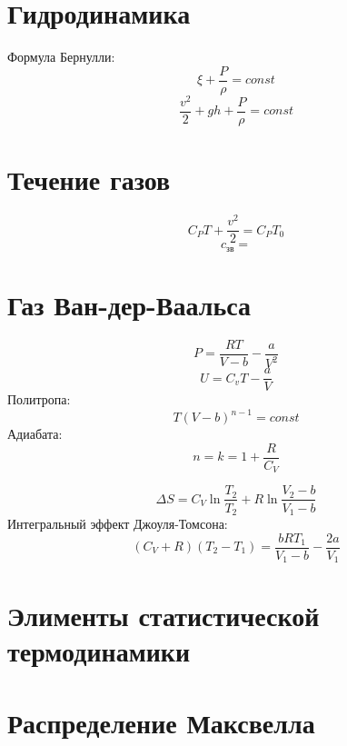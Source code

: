 \documentclass[12pt]{article}
\begin{document}
\section{Гидродинамика}
Формула Бернулли:
\begin{equation*}
\xi + \frac{P}{\rho} = const
\end{equation*}
\begin{equation*}
\frac{v^2}{2} + gh + \frac{P}{\rho} = const
\end{equation*}

\section{Течение газов}
\begin{equation*}
C_P T + \frac{v^2}{2} = C_P T_0
\end{equation*}
\begin{equation*}
c_{зв} = 
\end{equation*}

\section{Газ Ван-дер-Ваальса}
\begin{equation*}
P=\frac{RT}{V-b} - \frac{a}{V^2}
\end{equation*}
\begin{equation*}
U = C_v T - \frac{a}{V}
\end{equation*}
Политропа:
\begin{equation*}
T(V-b)^{n-1} = const
\end{equation*}
Адиабата:
\begin{equation*}
n = k = 1 + \frac{R}{C_V}
\end{equation*}

\begin{equation*}
\Delta S = C_V\ln \frac{T_2}{T_2} + R \ln \frac{V_2 - b}{V_1 - b}
\end{equation*}
Интегральный эффект Джоуля-Томсона:
\begin{equation*}
(C_V + R)(T_2-T_1) = \frac{bRT_1}{V_1-b} - \frac{2a}{V_1}
\end{equation*}

\onecolumn

\section{Элименты статистической термодинамики}

\section{Распределение Максвелла}
\end{document}
